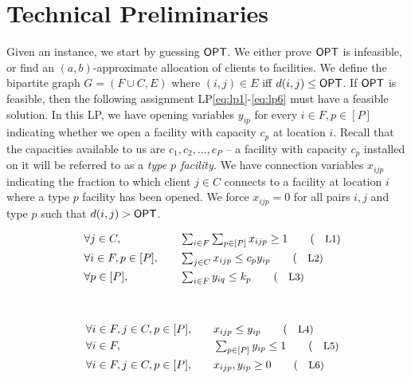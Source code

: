 \section{Technical Preliminaries}\label{sec:prelims}
Given an \mckc instance, we start by guessing $\mathsf{OPT}$. We either prove $\mathsf{OPT}$ is infeasible, or find an $(a,b)$-approximate allocation of clients to facilities.
	We define the bipartite graph $G = (F\cup C,E)$ where $(i,j)\in E$ iff $d(i,j) \leq \mathsf{OPT}$. If $\mathsf{OPT}$ is feasible, then the following assignment LP\eqref{eq:lp1}-\eqref{eq:lp6}
	must have a feasible solution.
In this LP, we  have opening  variables $y_{ip}$ for every $i\in F,p\in [P]$ indicating whether we open a facility with capacity $c_p$ at location $i$. Recall that the capacities available to us are $c_1, c_2, \ldots, c_P$ -- a facility with 
capacity $c_p$ installed on it will be referred to as a {\em type $p$ facility.}
	We have connection variables $x_{ijp}$ indicating the fraction to which client $j\in C$ connects to a facility at location $i$ where a type $p$ facility has been opened.
	We force $x_{ijp} = 0$ for all pairs $i,j$ and type $p$ such that  $d(i,j) > \mathsf{OPT}$.
	
		
		\begin{minipage}{0.45\textwidth}
			\begin{alignat}{4}
				& \quad \forall j\in C,   &&\quad  \textstyle \sum_{i\in F} \sum_{p\in [P]}  x_{ijp} \geq 1 \label{eq:lp1} \tag{\small{L1}}  \\
				& \quad \forall i\in F,p\in [P] ,  &&\quad  \textstyle \sum_{j\in C}  x_{ijp} \leq c_py_{ip} \label{eq:lp2} \tag{\small{L2}} \\
				& \quad \forall p\in [P], && \quad \textstyle \sum_{i\in F} y_{iq}   \leq k_p \label{eq:lp3}  \tag{\small{L3}}
			\end{alignat}
		\end{minipage}
		~\vline~
		\begin{minipage}{0.45\textwidth}
			\begin{alignat}{4}
				& \quad \forall i\in F, j\in C,p\in [P],  && \quad x_{ijp} \leq y_{ip}\label{eq:lp4}   \tag{\small{L4}} \\
				& \quad \forall i\in F, && \quad \textstyle\sum_{p\in [P]} y_{ip} \leq 1 \label{eq:lp5}  \tag{\small{L5}} \\
				& \quad \forall i\in F,j\in C,p\in [P], && \quad x_{ijp},y_{ip} \geq 0\label{eq:lp6}\tag{\small{L6}}
			\end{alignat}
		\end{minipage}
\smallskip

